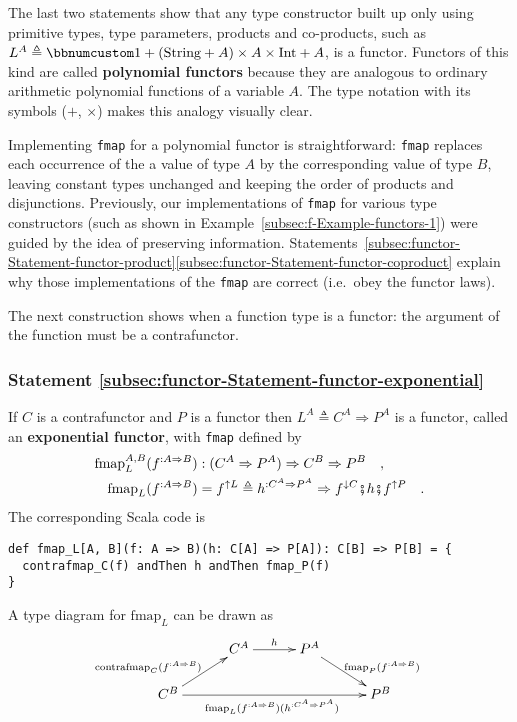 The last two statements show that any type constructor built up only
using primitive types, type parameters, products and co-products,
such as $L^{A}\triangleq\bbnum 1+(\text{String}+A)\times A\times\text{Int}+A$,
is a functor. Functors of this kind are called \textbf{polynomial
functors} because they are analogous to ordinary arithmetic polynomial
functions of a variable $A$. The type notation with its symbols ($+$,
$\times$) makes this analogy visually clear. 

Implementing \lstinline!fmap! for a polynomial functor is straightforward:
\lstinline!fmap! replaces each occurrence of the a value of type
$A$ by the corresponding value of type $B$, leaving constant types
unchanged and keeping the order of products and disjunctions. Previously,
our implementations of \lstinline!fmap! for various type constructors
(such as shown in Example~\ref{subsec:f-Example-functors-1}) were
guided by the idea of preserving information. Statements~\ref{subsec:functor-Statement-functor-product}\textendash \ref{subsec:functor-Statement-functor-coproduct}
explain why those implementations of the \lstinline!fmap! are correct
(i.e.~obey the functor laws).

The next construction shows when a function type is a functor: the
argument of the function must be a contrafunctor.

\subsubsection{Statement \label{subsec:functor-Statement-functor-exponential}\ref{subsec:functor-Statement-functor-exponential}}

If $C$ is a contrafunctor and $P$ is a functor then $L^{A}\triangleq C^{A}\Rightarrow P^{A}$
is a functor, called an \textbf{exponential
functor}, with \lstinline!fmap! defined by
\begin{align}
\text{fmap}_{L}^{A,B}(f^{:A\Rightarrow B}) & :(C^{A}\Rightarrow P^{A})\Rightarrow C^{B}\Rightarrow P^{B}\quad,\nonumber \\
\text{fmap}_{L}(f^{:A\Rightarrow B}) & =f^{\uparrow L}\triangleq h^{:C^{A}\Rightarrow P^{A}}\Rightarrow f^{\downarrow C}\bef h\bef f^{\uparrow P}\quad.\label{eq:f-functor-exponential-def-of-fmap}
\end{align}
The corresponding Scala code is
\begin{lstlisting}
def fmap_L[A, B](f: A => B)(h: C[A] => P[A]): C[B] => P[B] = {
  contrafmap_C(f) andThen h andThen fmap_P(f)
}
\end{lstlisting}
A type diagram for $\text{fmap}_{L}$ can be drawn as
\[
\xymatrix{\xyScaleY{1.5pc}\xyScaleX{2.5pc} & C^{A}\ar[r]\sp(0.5){h} & P^{A}\ar[rd]\sp(0.6){\ \text{fmap}_{P}(f^{:A\Rightarrow B})\ }\\
C^{B}\ar[ru]\sp(0.4){\text{contrafmap}_{C}(f^{:A\Rightarrow B})\ ~~}\ar[rrr]\sb(0.5){\text{fmap}_{L}(f^{:A\Rightarrow B})(h^{:C^{A}\Rightarrow P^{A}})\ } &  &  & P^{B}
}
\]


